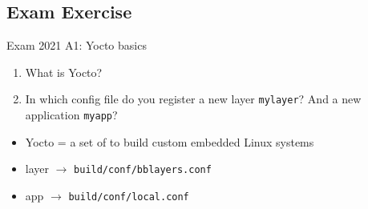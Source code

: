 \subsection{Exam Exercise}

\begin{example2}{Exam 2021 A1: Yocto basics}
    \begin{enumerate}
        \item What is Yocto?
        \item In which config file do you register a new layer \texttt{mylayer}?
              And a new application \texttt{myapp}?
    \end{enumerate}
    \tcblower
    \begin{itemize}
        \item Yocto = a set of  to build
              custom embedded Linux systems
        \item layer $\to$ \texttt{build/conf/bblayers.conf}
        \item app $\to$ \texttt{build/conf/local.conf}
    \end{itemize}
\end{example2}

\raggedcolumns
